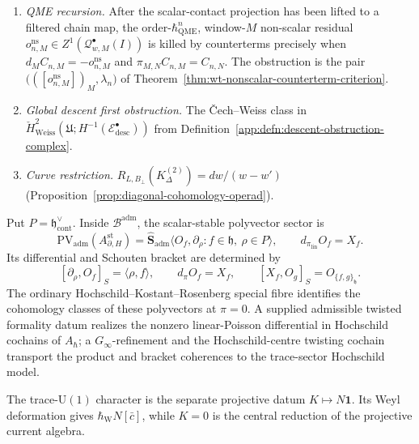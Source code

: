 \documentclass[11pt]{memoir}
\begin{document}
\begin{rmk}
\begin{enumerate}[label=\textup{(\arabic*)}]
      invariant centre classes are the case \(\rho_x=\rho_x^{P_0}=0\)
      (Definition~\ref{defn:admissible-hochschild-centre-lift}).
    \item \emph{QME recursion.}  After the scalar-contact projection has
      been lifted to a filtered chain map, the order-\(\hbar_{\mathrm{QME}}^n\),
      window-\(M\) non-scalar residual
      \(o^{\mathrm{ns}}_{n,M}\in Z^1(\mathcal Q^\bullet_{w,M}(I))\)
      is killed by counterterms precisely when
      \(d_MC_{n,M}=-o^{\mathrm{ns}}_{n,M}\) and
      \(\pi_{M,N}C_{n,M}=C_{n,N}\).  The obstruction is the pair
      \(\bigl(([o^{\mathrm{ns}}_{n,M}])_M,\lambda_n\bigr)\) of
      Theorem~\ref{thm:wt-nonscalar-counterterm-criterion}.
    \item \emph{Global descent first obstruction.}
      The Čech--Weiss class in
      \(\check H^2_{\mathrm{Weiss}}
      (\mathfrak U;H^{-1}(\mathcal E^\bullet_{\mathrm{desc}}))\) from
      Definition~\ref{app:defn:descent-obstruction-complex}.
    \item \emph{Curve restriction.}
      $R_{L,B_\perp}(K^{(2)}_\Delta)=dw/(w-w')$
      (Proposition~\ref{prop:diagonal-cohomology-operad}).
  \end{enumerate}
\end{rmk}

\begin{thm}
\label{thm:protected-summand-exhausts}
  Put \(P=\mathfrak h^\vee_{\mathrm{cont}}\).  Inside
  \(\mathcal B^{\mathrm{adm}}\), the scalar-stable polyvector sector is
  \[
    \mathrm{PV}_{\mathrm{adm}}(A_{\partial,H}^{\mathrm{st}})
    =
    \widehat{\mathbf S}_{\mathrm{adm}}
      \bigl\langle O_f,\partial_\rho:
        f\in\mathfrak h,\ \rho\in P\bigr\rangle,
    \qquad
    d_{\pi_{\mathrm{lin}}}O_f=X_f.
  \]
  Its differential and Schouten bracket are determined by
  \[
    [\partial_\rho,O_f]_S=\langle\rho,f\rangle,
    \qquad
    d_\pi O_f=X_f,
    \qquad
    [X_f,O_g]_S=O_{\{f,g\}_{\mathfrak h}}.
  \]
  The ordinary Hochschild--Kostant--Rosenberg special fibre identifies
  the cohomology classes of these polyvectors at \(\pi=0\).  A supplied
  admissible twisted formality datum realizes the nonzero linear-Poisson
  differential in Hochschild cochains of \(A_\hbar\); a
  \(G_\infty\)-refinement and the Hochschild-centre twisting cochain
  transport the product and bracket coherences to the trace-sector
  Hochschild model.

  The trace-\(\mathrm U(1)\) character is the separate projective datum
  \(K\mapsto N\mathbf1\).  Its Weyl deformation gives
  \(\hbar_{\mathrm W}N[\bar c]\), while \(K=0\) is the central
  reduction of the projective current algebra.
\end{thm}
\end{document}
